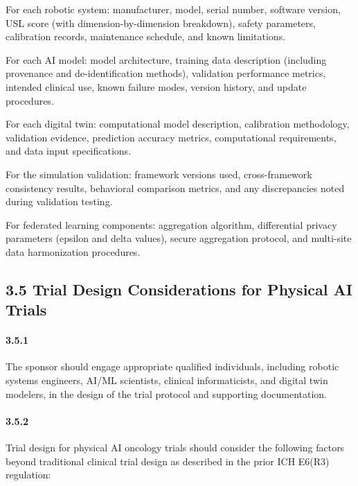 \documentclass[11pt]{article}
\begin{document}
\begin{description}[leftmargin=2.5cm,style=sameline]

\item[(a)] For each robotic system: manufacturer, model, serial number, software version, USL score (with dimension-by-dimension breakdown), safety parameters, calibration records, maintenance schedule, and known limitations.

\item[(b)] For each AI model: model architecture, training data description (including provenance and de-identification methods), validation performance metrics, intended clinical use, known failure modes, version history, and update procedures.

\item[(c)] For each digital twin: computational model description, calibration methodology, validation evidence, prediction accuracy metrics, computational requirements, and data input specifications.

\item[(d)] For the simulation validation: framework versions used, cross-framework consistency results, behavioral comparison metrics, and any discrepancies noted during validation testing.

\item[(e)] For federated learning components: aggregation algorithm, differential privacy parameters (epsilon and delta values), secure aggregation protocol, and multi-site data harmonization procedures.

\end{description}

\subsection{3.5 Trial Design Considerations for Physical AI Trials}

\paragraph{3.5.1} The sponsor should engage appropriate qualified individuals, including robotic systems engineers, AI/ML scientists, clinical informaticists, and digital twin modelers, in the design of the trial protocol and supporting documentation.

\paragraph{3.5.2} Trial design for physical AI oncology trials should consider the following factors beyond traditional clinical trial design as described in the prior ICH E6(R3) regulation:
\end{document}
